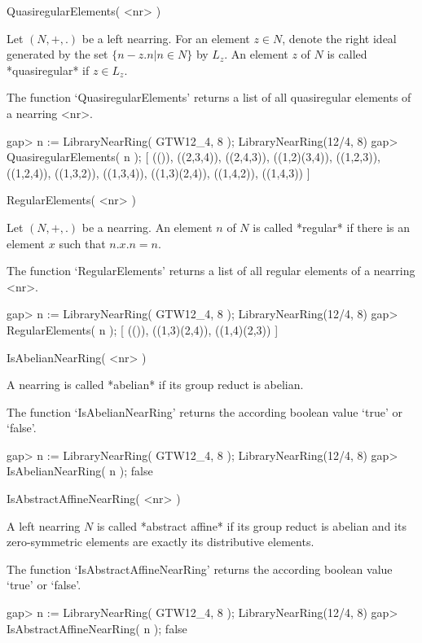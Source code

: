 \>QuasiregularElements( <nr> )

Let $(N,+,.)$ be a left nearring. For an element $z \in N$, 
denote the right ideal generated by the set $\{n - z.n | n \in N\}$
by $L_z$.
An element $z$ of $N$ is called *quasiregular* if $z \in L_z$.

The function `QuasiregularElements' returns a list of all 
quasiregular elements of a nearring <nr>.

\beginexample
    gap> n := LibraryNearRing( GTW12_4, 8 );            
    LibraryNearRing(12/4, 8)
    gap> QuasiregularElements( n );
    [ (()), ((2,3,4)), ((2,4,3)), ((1,2)(3,4)), ((1,2,3)), ((1,2,4)), 
      ((1,3,2)), ((1,3,4)), ((1,3)(2,4)), ((1,4,2)), ((1,4,3)) ]
\endexample

\>RegularElements( <nr> )

Let $(N,+,.)$ be a nearring. An element $n$ of $N$ is called *regular* if
there is an element $x$ such that $n. x. n = n$.

The function `RegularElements' returns a list of all regular elements of a
nearring <nr>.

\beginexample
    gap> n := LibraryNearRing( GTW12_4, 8 );            
    LibraryNearRing(12/4, 8)
    gap> RegularElements( n );
    [ (()), ((1,3)(2,4)), ((1,4)(2,3)) ]
\endexample



\>IsAbelianNearRing( <nr> )

A nearring is called *abelian* if its group reduct is abelian.

The function `IsAbelianNearRing' returns the according boolean value
`true' or `false'.

\beginexample
    gap> n := LibraryNearRing( GTW12_4, 8 );            
    LibraryNearRing(12/4, 8)
    gap> IsAbelianNearRing( n );
    false
\endexample

\>IsAbstractAffineNearRing( <nr> )

A left nearring $N$ is called *abstract affine* if its group reduct is
abelian and its zero-symmetric elements are exactly its distributive
elements.

The function `IsAbstractAffineNearRing' returns the according boolean 
value `true' or `false'.

\beginexample
    gap> n := LibraryNearRing( GTW12_4, 8 );            
    LibraryNearRing(12/4, 8)
    gap> IsAbstractAffineNearRing( n );
    false
\endexample

